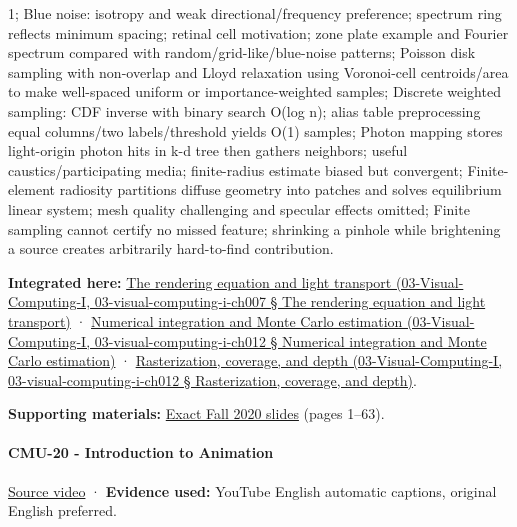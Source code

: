1; Blue noise: isotropy and weak directional/frequency preference; spectrum ring reflects minimum spacing; retinal cell motivation; zone plate example and Fourier spectrum compared with random/grid-like/blue-noise patterns; Poisson disk sampling with non-overlap and Lloyd relaxation using Voronoi-cell centroids/area to make well-spaced uniform or importance-weighted samples; Discrete weighted sampling: CDF inverse with binary search O(log n); alias table preprocessing equal columns/two labels/threshold yields O(1) samples; Photon mapping stores light-origin photon hits in k-d tree then gathers neighbors; useful caustics/participating media; finite-radius estimate biased but convergent; Finite-element radiosity partitions diffuse geometry into patches and solves equilibrium linear system; mesh quality challenging and specular effects omitted; Finite sampling cannot certify no missed feature; shrinking a pinhole while brightening a source creates arbitrarily hard-to-find contribution.

\textbf{Integrated here:} \href{}{The rendering equation and light transport (03-Visual-Computing-I, 03-visual-computing-i-ch007 § The rendering equation and light transport)} · \href{}{Numerical integration and Monte Carlo estimation (03-Visual-Computing-I, 03-visual-computing-i-ch012 § Numerical integration and Monte Carlo estimation)} · \href{}{Rasterization, coverage, and depth (03-Visual-Computing-I, 03-visual-computing-i-ch012 § Rasterization, coverage, and depth)}.

\textbf{Supporting materials:} \href{https://15462.courses.cs.cmu.edu/fall2020content/lectures/19_variancereduction/19_variancereduction_slides.pdf}{Exact Fall 2020 slides} (pages 1--63).

\paragraph{CMU-20 - Introduction to Animation}\label{cmu-20---introduction-to-animation}

\href{https://www.youtube.com/watch?v=XVTw68iHef0}{Source video} · \textbf{Evidence used:} YouTube English automatic captions, original English preferred.

